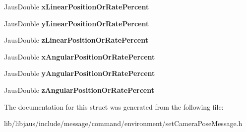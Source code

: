 \begin{DoxyCompactItemize}
\item 
\hypertarget{struct_set_camera_pose_message_struct_ade839fef0634afff94ed9f9bd11ec24b}{\-Jaus\-Double {\bfseries x\-Linear\-Position\-Or\-Rate\-Percent}}\label{struct_set_camera_pose_message_struct_ade839fef0634afff94ed9f9bd11ec24b}

\item 
\hypertarget{struct_set_camera_pose_message_struct_a0ca359ab62f7bab0d109392aeae711dc}{\-Jaus\-Double {\bfseries y\-Linear\-Position\-Or\-Rate\-Percent}}\label{struct_set_camera_pose_message_struct_a0ca359ab62f7bab0d109392aeae711dc}

\item 
\hypertarget{struct_set_camera_pose_message_struct_a61887ba21d5ba1f43b5d3322fb2fa92b}{\-Jaus\-Double {\bfseries z\-Linear\-Position\-Or\-Rate\-Percent}}\label{struct_set_camera_pose_message_struct_a61887ba21d5ba1f43b5d3322fb2fa92b}

\item 
\hypertarget{struct_set_camera_pose_message_struct_a3e1cccf3c5bc412498c00e4eeb5314b6}{\-Jaus\-Double {\bfseries x\-Angular\-Position\-Or\-Rate\-Percent}}\label{struct_set_camera_pose_message_struct_a3e1cccf3c5bc412498c00e4eeb5314b6}

\item 
\hypertarget{struct_set_camera_pose_message_struct_a4f989aeaf7f82bf2b70fb27d963cf42b}{\-Jaus\-Double {\bfseries y\-Angular\-Position\-Or\-Rate\-Percent}}\label{struct_set_camera_pose_message_struct_a4f989aeaf7f82bf2b70fb27d963cf42b}

\item 
\hypertarget{struct_set_camera_pose_message_struct_a310f883c11271cd524105fc5d3161907}{\-Jaus\-Double {\bfseries z\-Angular\-Position\-Or\-Rate\-Percent}}\label{struct_set_camera_pose_message_struct_a310f883c11271cd524105fc5d3161907}

\end{DoxyCompactItemize}


\-The documentation for this struct was generated from the following file\-:\begin{DoxyCompactItemize}
\item 
lib/libjaus/include/message/command/environment/set\-Camera\-Pose\-Message.\-h\end{DoxyCompactItemize}
